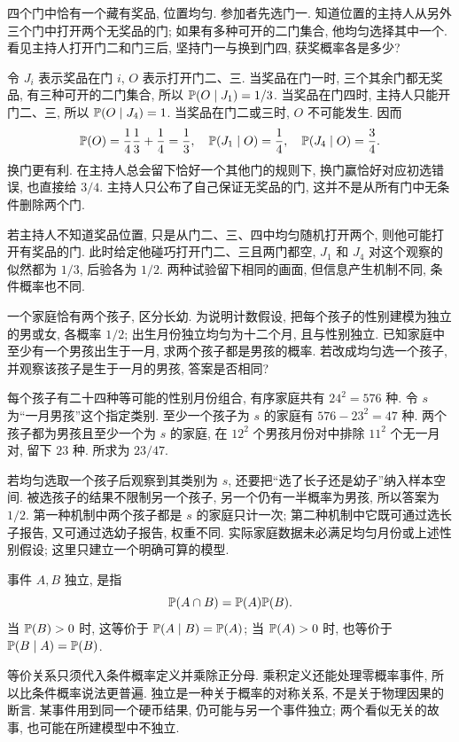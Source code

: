 \begin{example}
四个门中恰有一个藏有奖品, 位置均匀. 参加者先选门一. 知道位置的主持人从另外三个门中打开两个无奖品的门; 如果有多种可开的二门集合, 他均匀选择其中一个. 看见主持人打开门二和门三后, 坚持门一与换到门四, 获奖概率各是多少?
\end{example}
\begin{solution}
令 $J_i$ 表示奖品在门 $i$, $O$ 表示打开门二、三. 当奖品在门一时, 三个其余门都无奖品, 有三种可开的二门集合, 所以 $\mathbb P(O\mid J_1)=1/3$. 当奖品在门四时, 主持人只能开门二、三, 所以 $\mathbb P(O\mid J_4)=1$. 当奖品在门二或三时, $O$ 不可能发生. 因而
\[
 \mathbb P(O)=\frac14\frac13+\frac14=\frac13,
 \quad \mathbb P(J_1\mid O)=\frac14,
 \quad \mathbb P(J_4\mid O)=\frac34.
\]
换门更有利. 在主持人总会留下恰好一个其他门的规则下, 换门赢恰好对应初选错误, 也直接给 $3/4$. 主持人只公布了自己保证无奖品的门, 这并不是从所有门中无条件删除两个门.

若主持人不知道奖品位置, 只是从门二、三、四中均匀随机打开两个, 则他可能打开有奖品的门. 此时给定他碰巧打开门二、三且两门都空, $J_1$ 和 $J_4$ 对这个观察的似然都为 $1/3$, 后验各为 $1/2$. 两种试验留下相同的画面, 但信息产生机制不同, 条件概率也不同.
\end{solution}

\begin{example}
一个家庭恰有两个孩子, 区分长幼. 为说明计数假设, 把每个孩子的性别建模为独立的男或女, 各概率 $1/2$; 出生月份独立均匀为十二个月, 且与性别独立. 已知家庭中至少有一个男孩出生于一月, 求两个孩子都是男孩的概率. 若改成均匀选一个孩子, 并观察该孩子是生于一月的男孩, 答案是否相同?
\end{example}
\begin{solution}
每个孩子有二十四种等可能的性别月份组合, 有序家庭共有 $24^2=576$ 种. 令 $s$ 为``一月男孩''这个指定类别. 至少一个孩子为 $s$ 的家庭有 $576-23^2=47$ 种. 两个孩子都为男孩且至少一个为 $s$ 的家庭, 在 $12^2$ 个男孩月份对中排除 $11^2$ 个无一月对, 留下 $23$ 种. 所求为 $23/47$.

若均匀选取一个孩子后观察到其类别为 $s$, 还要把``选了长子还是幼子''纳入样本空间. 被选孩子的结果不限制另一个孩子, 另一个仍有一半概率为男孩, 所以答案为 $1/2$. 第一种机制中两个孩子都是 $s$ 的家庭只计一次; 第二种机制中它既可通过选长子报告, 又可通过选幼子报告, 权重不同. 实际家庭数据未必满足均匀月份或上述性别假设; 这里只建立一个明确可算的模型.
\end{solution}

\begin{definition}
事件 $A,B$ 独立, 是指
\[
 \mathbb P(A\cap B)=\mathbb P(A)\mathbb P(B).
\]
当 $\mathbb P(B)>0$ 时, 这等价于 $\mathbb P(A\mid B)=\mathbb P(A)$; 当 $\mathbb P(A)>0$ 时, 也等价于 $\mathbb P(B\mid A)=\mathbb P(B)$.
\end{definition}
等价关系只须代入条件概率定义并乘除正分母. 乘积定义还能处理零概率事件, 所以比条件概率说法更普遍. 独立是一种关于概率的对称关系, 不是关于物理因果的断言. 某事件用到同一个硬币结果, 仍可能与另一个事件独立; 两个看似无关的故事, 也可能在所建模型中不独立.

